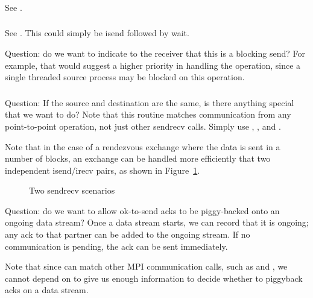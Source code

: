 \documentclass{article}
\begin{document}
\subsubsection{}
See .

\subsubsection{}
See .  This could simply be isend followed by wait.

Question: do we want to indicate to the receiver that this is a
blocking send?  For example, that would suggest a higher priority in
handling the operation, since a single threaded source process may be
blocked on this operation.

\subsubsection{}
Question: If the source and destination are the same, is there anything
special that we want to do?  Note that this routine matches communication from
any point-to-point operation, not just other sendrecv calls.  
Simply use , , and
. 

Note that in the case of a rendezvous exchange where the data is sent
in a number of blocks, an exchange can be handled more efficiently
that two independent isend/irecv pairs, as shown in Figure~\ref{fig:sendrecv}.
\begin{figure}
\centerline{}
\caption{Two sendrecv scenarios}\label{fig:sendrecv}
\end{figure}
Question: do we want to allow ok-to-send acks to be piggy-backed onto
an ongoing data stream?  Once a data stream starts, we can record that
it is ongoing; any ack to that partner can be added to the ongoing
stream.  If no communication is pending, the ack can be sent
immediately.

Note that since  can match other MPI
communication calls, such as  and
, we cannot depend on  to
give us enough information to decide whether to piggyback acks on a
data stream.
\end{document}
